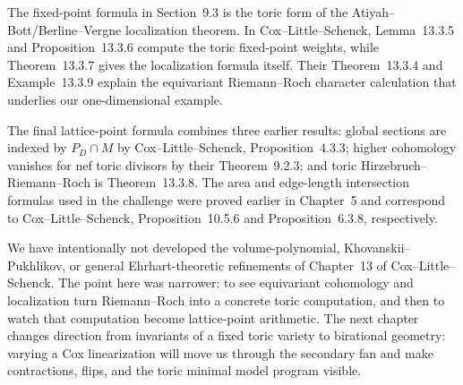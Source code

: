 The fixed-point formula in Section~9.3 is the toric form of the
Atiyah--Bott/Berline--Vergne localization theorem.  In
Cox--Little--Schenck, Lemma~13.3.5 and Proposition~13.3.6 compute the
toric fixed-point weights, while Theorem~13.3.7 gives the localization
formula itself.  Their Theorem~13.3.4 and Example~13.3.9 explain the
equivariant Riemann--Roch character calculation that underlies our
one-dimensional example.

The final lattice-point formula combines three earlier results:
global sections are indexed by \(P_D\cap M\) by
Cox--Little--Schenck, Proposition~4.3.3; higher cohomology vanishes for
nef toric divisors by their Theorem~9.2.3; and toric
Hirzebruch--Riemann--Roch is Theorem~13.3.8.  The area and edge-length
intersection formulas used in the challenge were proved earlier in
Chapter~5 and correspond to Cox--Little--Schenck,
Proposition~10.5.6 and Proposition~6.3.8, respectively.

We have intentionally not developed the volume-polynomial,
Khovanskii--Pukhlikov, or general Ehrhart-theoretic refinements of
Chapter~13 of Cox--Little--Schenck.  The point here was narrower: to
see equivariant cohomology and localization turn Riemann--Roch into a
concrete toric computation, and then to watch that computation become
lattice-point arithmetic.  The next chapter changes direction from
invariants of a fixed toric variety to birational geometry: varying a
Cox linearization will move us through the secondary fan and make
contractions, flips, and the toric minimal model program visible.
